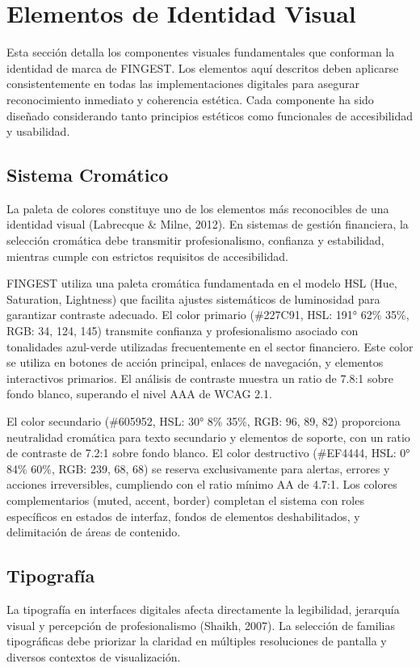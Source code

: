 \documentclass[12pt,a4paper,oneside]{article}
\begin{document}
\section{Elementos de Identidad Visual}

Esta sección detalla los componentes visuales fundamentales que conforman la identidad de marca de FINGEST. Los elementos aquí descritos deben aplicarse consistentemente en todas las implementaciones digitales para asegurar reconocimiento inmediato y coherencia estética. Cada componente ha sido diseñado considerando tanto principios estéticos como funcionales de accesibilidad y usabilidad.

\subsection{Sistema Cromático}

La paleta de colores constituye uno de los elementos más reconocibles de una identidad visual (Labrecque \& Milne, 2012). En sistemas de gestión financiera, la selección cromática debe transmitir profesionalismo, confianza y estabilidad, mientras cumple con estrictos requisitos de accesibilidad.

FINGEST utiliza una paleta cromática fundamentada en el modelo HSL (Hue, Saturation, Lightness) que facilita ajustes sistemáticos de luminosidad para garantizar contraste adecuado. El color primario (\#227C91, HSL: 191° 62\% 35\%, RGB: 34, 124, 145) transmite confianza y profesionalismo asociado con tonalidades azul-verde utilizadas frecuentemente en el sector financiero. Este color se utiliza en botones de acción principal, enlaces de navegación, y elementos interactivos primarios. El análisis de contraste muestra un ratio de 7.8:1 sobre fondo blanco, superando el nivel AAA de WCAG 2.1.

El color secundario (\#605952, HSL: 30° 8\% 35\%, RGB: 96, 89, 82) proporciona neutralidad cromática para texto secundario y elementos de soporte, con un ratio de contraste de 7.2:1 sobre fondo blanco. El color destructivo (\#EF4444, HSL: 0° 84\% 60\%, RGB: 239, 68, 68) se reserva exclusivamente para alertas, errores y acciones irreversibles, cumpliendo con el ratio mínimo AA de 4.7:1. Los colores complementarios (muted, accent, border) completan el sistema con roles específicos en estados de interfaz, fondos de elementos deshabilitados, y delimitación de áreas de contenido.

\subsection{Tipografía}
La tipografía en interfaces digitales afecta directamente la legibilidad, jerarquía visual y percepción de profesionalismo (Shaikh, 2007). La selección de familias tipográficas debe priorizar la claridad en múltiples resoluciones de pantalla y diversos contextos de visualización.
\end{document}
